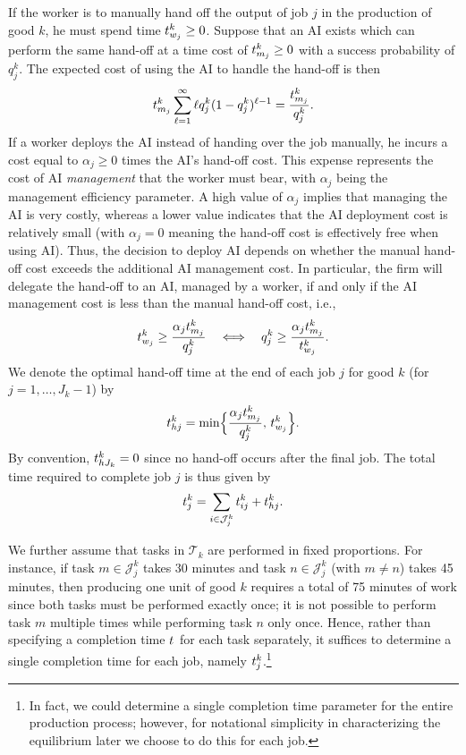 \documentclass{article}
\theoremstyle{plain}
\theoremstyle{plain}
\begin{document}
If the worker is to manually hand off the output of job $j$ in the production of good $k$, he must spend time $t_{w_j}^k \geq 0$.  
Suppose that an AI exists which can perform the same hand-off at a time cost of $t_{m_j}^k \geq 0$ with a success probability of $q_j^k$.  
The expected cost of using the AI to handle the hand-off is then
\[
t_{m_j}^k \sum_{\ell=1}^{\infty} \ell q_j^k (1 - q_j^k)^{\ell - 1} = \frac{t_{m_j}^k}{q_j^k}.
\]
If a worker deploys the AI instead of handing over the job manually, he incurs a cost equal to $\alpha_j \geq 0$ times the AI’s hand-off cost.  
This expense represents the cost of AI \emph{management} that the worker must bear, with $\alpha_j$ being the management efficiency parameter. 
A high value of $\alpha_j$ implies that managing the AI is very costly, whereas a lower value indicates that the AI deployment cost is relatively small (with $\alpha_j = 0$ meaning the hand-off cost is effectively free when using AI).  
Thus, the decision to deploy AI depends on whether the manual hand-off cost exceeds the additional AI management cost.  
In particular, the firm will delegate the hand-off to an AI, managed by a worker, if and only if the AI management cost is less than the manual hand-off cost, i.e.,
\[
t_{w_j}^k \geq \frac{\alpha_j t_{m_j}^k}{q_j^k}
\quad \Longleftrightarrow \quad 
q_j^k \geq \frac{\alpha_j t_{m_j}^k}{t_{w_j}^k}.
\]
We denote the optimal hand-off time at the end of each job $j$ for good $k$ (for $j=1,\ldots,J_k-1$) by
\[
t_{hj}^k = \min\Bigl\{\frac{\alpha_j t_{m_j}^k}{q_j^k},\, t_{w_j}^k\Bigr\}.
\]
By convention, $t_{hJ_k}^k = 0$ since no hand-off occurs after the final job.  
The total time required to complete job $j$ is thus given by
\[
t_{j}^k = \sum_{i \in \mathcal{J}_j^k} t_{ij}^{k} + t_{hj}^k.
\]

We further assume that tasks in $\mathcal{T}_k$ are performed in fixed proportions.  
For instance, if task $m \in \mathcal{J}_j^k$ takes 30 minutes and task $n \in \mathcal{J}_j^k$ (with $m \neq n$) takes 45 minutes, then producing one unit of good $k$ requires a total of 75 minutes of work since both tasks must be performed exactly once; it is not possible to perform task $m$ multiple times while performing task $n$ only once.  
Hence, rather than specifying a completion time $t_{}$ for each task separately, it suffices to determine a single completion time for each job, namely $t_{j}^k$.\footnote{In fact, we could determine a single completion time parameter for the entire production process; however, for notational simplicity in characterizing the equilibrium later we choose to do this for each job.} \\ %
\end{document}

